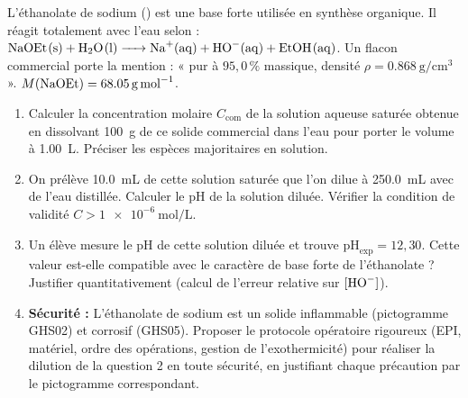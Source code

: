 \documentclass[11pt]{article}
\begin{document}
\begin{exercice}
L'éthanolate de sodium () est une base forte utilisée en synthèse organique. Il réagit totalement avec l'eau selon : $\ce{NaOEt(s) + H2O(l) -> Na+(aq) + HO-(aq) + EtOH(aq)}$. Un flacon commercial porte la mention : «  pur à $95,0\,\%$ massique, densité $\rho = \SI{0,868}{\gram\per\centi\meter\cubed}$ ». $M(\ce{NaOEt}) = \SI{68,05}{\gram\per\mole}$.
\begin{enumerate}
    \item Calculer la concentration molaire $C_\text{com}$ de la solution aqueuse saturée obtenue en dissolvant \SI{100}{\gram} de ce solide commercial dans l'eau pour porter le volume à \SI{1,00}{\liter}. Préciser les espèces majoritaires en solution.
    \item On prélève \SI{10,0}{\milli\liter} de cette solution saturée que l'on dilue à \SI{250,0}{\milli\liter} avec de l'eau distillée. Calculer le pH de la solution diluée. Vérifier la condition de validité $C > \SI{1e-6}{\mole\per\liter}$.
    \item Un élève mesure le pH de cette solution diluée et trouve $\text{pH}_\text{exp} = 12,30$. Cette valeur est-elle compatible avec le caractère de base forte de l'éthanolate ? Justifier quantitativement (calcul de l'erreur relative sur $[\ce{HO-}]$).
    \item \textbf{Sécurité :} L'éthanolate de sodium est un solide inflammable (pictogramme GHS02) et corrosif (GHS05). Proposer le protocole opératoire rigoureux (EPI, matériel, ordre des opérations, gestion de l'exothermicité) pour réaliser la dilution de la question 2 en toute sécurité, en justifiant chaque précaution par le pictogramme correspondant.
\end{enumerate}
\end{exercice}
\end{document}
